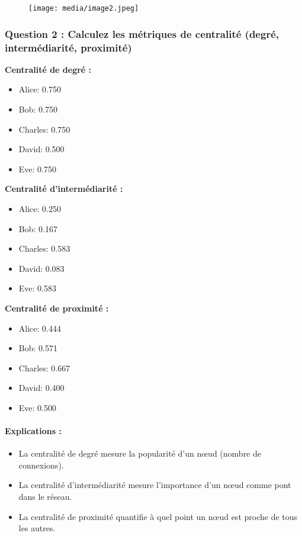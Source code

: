 \documentclass[12pt, a4paper]{article}
\begin{document}
	\begin{figure}[H]
		\centering
		\texttt{[image: media/image2.jpeg]}
	\end{figure}
	
	\subsubsection*{Question 2 : Calculez les métriques de centralité (degré, intermédiarité, proximité)}
	
	\textbf{Centralité de degré :}
	\begin{itemize}
		\item Alice: 0.750
		\item Bob: 0.750
		\item Charles: 0.750
		\item David: 0.500
		\item Eve: 0.750
	\end{itemize}
	
	\textbf{Centralité d'intermédiarité :}
	\begin{itemize}
		\item Alice: 0.250
		\item Bob: 0.167
		\item Charles: 0.583
		\item David: 0.083
		\item Eve: 0.583
	\end{itemize}
	
	\textbf{Centralité de proximité :}
	\begin{itemize}
		\item Alice: 0.444
		\item Bob: 0.571
		\item Charles: 0.667
		\item David: 0.400
		\item Eve: 0.500
	\end{itemize}
	
	\paragraph{Explications :}
	\begin{itemize}
		\item La centralité de degré mesure la popularité d'un nœud (nombre de connexions).
		\item La centralité d'intermédiarité mesure l'importance d'un nœud comme pont dans le réseau.
		\item La centralité de proximité quantifie à quel point un nœud est proche de tous les autres.
	\end{itemize}
	
\end{document}
